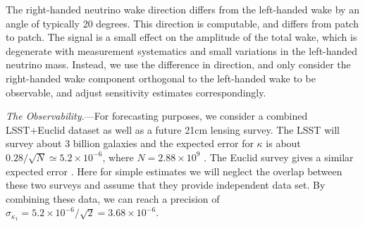 \documentclass[aps,prl,twocolumn,showpacs,superscriptaddress,groupedaddress,nofootinbib]{revtex4}  %
\newcommand{\eV}{\ensuremath{\,{\rm eV}}}
\newcommand{\nur}{\ensuremath{{\nu_R~}}}
\newcommand{\nul}{\ensuremath{{\nu_L~}}}
\begin{document}
The right-handed neutrino wake direction differs from the left-handed
wake by an angle of typically 20 degrees.  This direction is
computable, and differs from patch to patch.  The signal is a small
effect on the amplitude of the total wake, which is degenerate with
measurement systematics and small variations in the left-handed
neutrino mass.  Instead, we use the difference in direction, and only
consider the right-handed wake component orthogonal to the left-handed
wake to be observable, and adjust sensitivity estimates correspondingly.









{\it The Observability.}---For forecasting purposes, 
we consider a combined LSST+Euclid dataset
as well as a future 21cm lensing survey. The LSST will survey about 3 billion
galaxies and the expected error for $\kappa$ is about
$0.28/\sqrt{N}\simeq5.2\times10^{-6}$, where
$N=2.88\times10^9$ \cite{Abell:2009}. The Euclid survey 
gives a similar expected error \cite{Laureijs:2011}\cite{Amendola:2012}. 
Here for simple estimates we will neglect the overlap between
these two surveys and assume that they provide independent data set. 
By combining these data, we can reach a precision of
$\sigma_{\kappa_1}=5.2\times10^{-6}/\sqrt{2}=3.68\times10^{-6}$.
\end{document}
